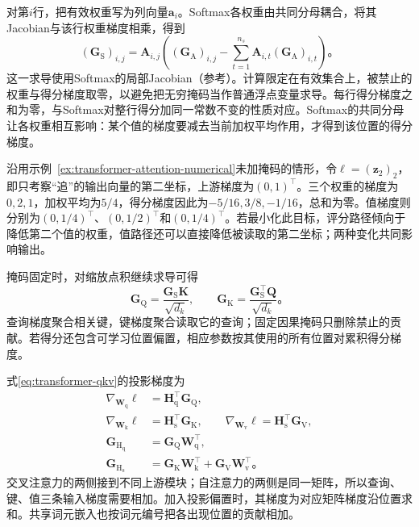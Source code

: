 对第$i$行，把有效权重写为列向量$\bm a_i$。Softmax各权重由共同分母耦合，将其Jacobian与该行权重梯度相乘，得到
\begin{equation}
  (\bm G_{\mathrm S})_{i,j}
   =\bm A_{i,j}\left((\bm G_{\mathrm A})_{i,j}
       -\sum_{t=1}^{n_s}\bm A_{i,t}(\bm G_{\mathrm A})_{i,t}\right)\text{。}
  \label{eq:transformer-softmax-gradient}
\end{equation}
这一求导使用Softmax的局部Jacobian（参考）。计算限定在有效集合上，被禁止的权重与得分梯度取零，以避免把无穷掩码当作普通浮点变量求导。每行得分梯度之和为零，与Softmax对整行得分加同一常数不变的性质对应。Softmax的共同分母让各权重相互影响：某个值的梯度要减去当前加权平均作用，才得到该位置的得分梯度。

\Needspace{45mm}
\begin{example}[从聚合误差到评分误差]
  \label{ex:transformer-gradient-numerical}
  沿用示例~\ref{ex:transformer-attention-numerical}未加掩码的情形，令$\ell=(\bm z_2)_2$，即只考察“追”的输出向量的第二坐标，上游梯度为$(0,1)^{\top}$。三个权重的梯度为$0,2,1$，加权平均为$5/4$，得分梯度因此为$-5/16,3/8,-1/16$，总和为零。值梯度则分别为$(0,1/4)^{\top}$、$(0,1/2)^{\top}$和$(0,1/4)^{\top}$。若最小化此目标，评分路径倾向于降低第二个值的权重，值路径还可以直接降低被读取的第二坐标；两种变化共同影响输出。
\end{example}

掩码固定时，对缩放点积继续求导可得
\begin{equation}
  \bm G_{\mathrm Q}=\frac{\bm G_{\mathrm S}\bm K}{\sqrt{d_k}},\qquad
  \bm G_{\mathrm K}=\frac{\bm G_{\mathrm S}^{\top}\bm Q}{\sqrt{d_k}}\text{。}
  \label{eq:transformer-qk-gradient}
\end{equation}
查询梯度聚合相关键，键梯度聚合读取它的查询；固定因果掩码只删除禁止的贡献。若得分还包含可学习位置偏置，相应参数按其使用的所有位置对累积得分梯度。

式\eqref{eq:transformer-qkv}的投影梯度为
\begin{equation}
  \begin{aligned}
    \nabla_{\bm W_{\mathrm q}}\ell&=\bm H_{\mathrm q}^{\top}\bm G_{\mathrm Q},\\
    \nabla_{\bm W_{\mathrm k}}\ell&=\bm H_{\mathrm s}^{\top}\bm G_{\mathrm K},\qquad
    \nabla_{\bm W_{\mathrm v}}\ell=\bm H_{\mathrm s}^{\top}\bm G_{\mathrm V},\\
    \bm G_{\mathrm H_{\mathrm q}}&=\bm G_{\mathrm Q}\bm W_{\mathrm q}^{\top},\\
    \bm G_{\mathrm H_{\mathrm s}}&=\bm G_{\mathrm K}\bm W_{\mathrm k}^{\top}
                      +\bm G_{\mathrm V}\bm W_{\mathrm v}^{\top}\text{。}
  \end{aligned}
  \label{eq:transformer-projection-gradient}
\end{equation}
交叉注意力的两侧接到不同上游模块；自注意力的两侧是同一矩阵，所以查询、键、值三条输入梯度需要相加。加入投影偏置时，其梯度为对应矩阵梯度沿位置求和。共享词元嵌入也按词元编号把各出现位置的贡献相加。

